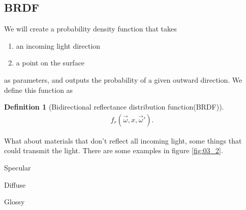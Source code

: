 \documentclass[10pt]{armath}
\numberwithin{equation}{section}
\newenvironment{Figure}
{\par\medskip\noindent\minipage{\linewidth}}
{\endminipage\par\medskip}
\theoremstyle{definition}
\newtheorem{definition}{Definition}[section]
\begin{document}
\begin{multicols}{2}
  \subsection{BRDF}%
  \label{sub:brdf}

  We will create a probability density function that takes
  \begin{enumerate}
    \item an incoming light direction
    \item a point on the surface
  \end{enumerate}
  as parameters, and outputs the probability of a given outward direction. We
  define this function as

  \begin{definition}[Bidirectional reflectance distribution function(BRDF)]
    \begin{align*}
      f_r\left(\vec{\omega},x,\vec{\omega}'\right).
    \end{align*}
  \end{definition}

  What about materials that don't reflect all incoming light, some things that
  could transmit the light. There are some examples in figure \ref{fig:03_2}.

  \begin{Figure}
    \begin{center}
      \centering
      \begin{minipage}{0.3\textwidth}
        \begin{center}
          
          Specular
        \end{center}
      \end{minipage}
      \begin{minipage}{0.3\textwidth}
        \begin{center}
          
          Diffuse
        \end{center}
      \end{minipage}
      \begin{minipage}{0.3\textwidth}
        \begin{center}
          
          Glossy
        \end{center}
      \end{minipage}
    \end{center}
    \label{fig:03_2}
  \end{Figure}


\end{multicols}
\end{document}
